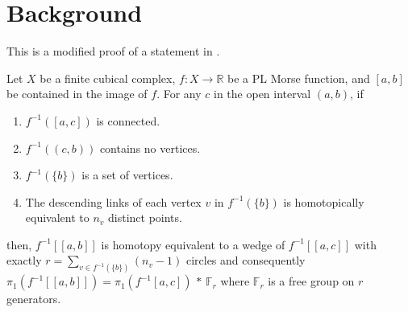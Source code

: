 \section{Background}

This is a modified proof of a statement in \cite{appiah2024algebraicstructurehyperbolicgraph}.
\begin{thm}
\label{thm:descendinglinks}
Let \(X\) be a finite cubical complex,
\(f: X \rightarrow \mathbb{R}\) be a PL Morse function,
and \([a,b]\) be contained in the image of \(f\). 
For any \(c\) in the open interval \((a,b)\), if
\begin{enumerate}
    \item \(f^{-1}([a,c])\) is connected.
    \item \(f^{-1}((c,b))\) contains no vertices.
    \item \(f^{-1}(\{b\})\) is a set of vertices.
    \item The descending links of each vertex \(v\) in \(f^{-1}(\{b\})\) 
        is homotopically equivalent to \(n_v\) distinct points.
\end{enumerate}
then, \(f^{-1}[[a,b]]\) is homotopy equivalent to a wedge of \(f^{-1}[[a,c]]\)
with exactly \(\displaystyle r = \sum_{v \in f^{-1}(\{b\})} (n_v - 1)\) circles and consequently
\(\pi_1(f^{-1}[[a,b]]) = \pi_1(f^{-1}[a,c])\,*\,\mathbb{F}_r\)
where \(\mathbb{F}_r\) is a free group on \(r\) generators.
\end{thm}


